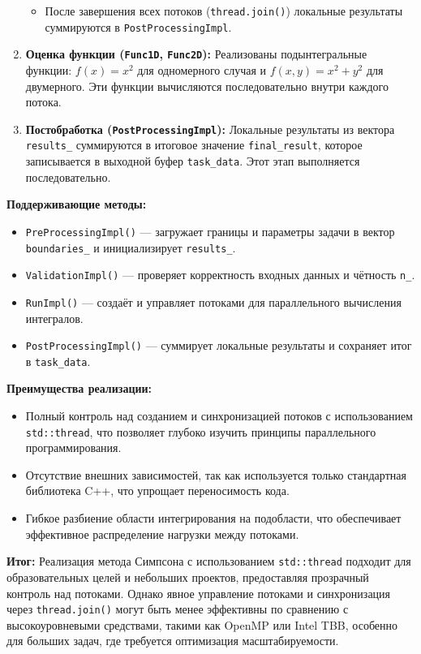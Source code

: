 \documentclass[12pt]{article}
\begin{document}
\begin{enumerate}
\begin{itemize}
    \item После завершения всех потоков (\texttt{thread.join()}) локальные результаты суммируются в \texttt{PostProcessingImpl}.
  \end{itemize}

  \item \textbf{Оценка функции (\texttt{Func1D}, \texttt{Func2D}):}
  Реализованы подынтегральные функции: $f(x) = x^2$ для одномерного случая и $f(x, y) = x^2 + y^2$ для двумерного. Эти функции вычисляются последовательно внутри каждого потока.

  \item \textbf{Постобработка (\texttt{PostProcessingImpl}):}
  Локальные результаты из вектора \texttt{results\_} суммируются в итоговое значение \texttt{final\_result}, которое записывается в выходной буфер \texttt{task\_data}. Этот этап выполняется последовательно.
\end{enumerate}

\textbf{Поддерживающие методы:}
\begin{itemize}
  \item \texttt{PreProcessingImpl()} --- загружает границы и параметры задачи в вектор \texttt{boundaries\_} и инициализирует \texttt{results\_}.
  \item \texttt{ValidationImpl()} --- проверяет корректность входных данных и чётность \texttt{n\_}.
  \item \texttt{RunImpl()} --- создаёт и управляет потоками для параллельного вычисления интегралов.
  \item \texttt{PostProcessingImpl()} --- суммирует локальные результаты и сохраняет итог в \texttt{task\_data}.
\end{itemize}

\textbf{Преимущества реализации:}
\begin{itemize}
  \item Полный контроль над созданием и синхронизацией потоков с использованием \texttt{std::thread}, что позволяет глубоко изучить принципы параллельного программирования.
  \item Отсутствие внешних зависимостей, так как используется только стандартная библиотека C++, что упрощает переносимость кода.
  \item Гибкое разбиение области интегрирования на подобласти, что обеспечивает эффективное распределение нагрузки между потоками.
\end{itemize}

\textbf{Итог:} Реализация метода Симпсона с использованием \texttt{std::thread} подходит для образовательных целей и небольших проектов, предоставляя прозрачный контроль над потоками. Однако явное управление потоками и синхронизация через \texttt{thread.join()} могут быть менее эффективны по сравнению с высокоуровневыми средствами, такими как OpenMP или Intel TBB, особенно для больших задач, где требуется оптимизация масштабируемости.
\end{document}
